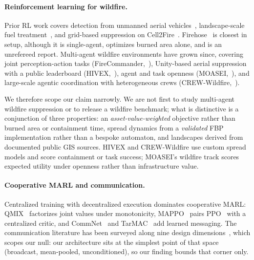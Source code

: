\documentclass[letterpaper]{article}
\begin{document}
\paragraph{Reinforcement learning for wildfire.} Prior RL work covers detection from unmanned aerial vehicles~\citep{ghali2022}, landscape-scale fuel treatment~\citep{altamimi2022wildfire}, and grid-based suppression on Cell2Fire~\citep{shen2022firehose}. Firehose~\citep{shen2022firehose} is closest in setup, although it is single-agent, optimizes burned area alone, and is an unrefereed report. Multi-agent wildfire environments have grown since, covering joint perception-action tasks (FireCommander,~\citealp{seraj2020firecommander}), Unity-based aerial suppression with a public leaderboard (HIVEX,~\citealp{siedler2025hivex}), agent and task openness (MOASEI,~\citealp{patino2025moasei}), and large-scale agentic coordination with heterogeneous crews (CREW-Wildfire,~\citealp{hyun2025crewwildfire}).

We therefore scope our claim narrowly. We are not first to study multi-agent wildfire suppression or to release a wildfire benchmark; what is distinctive is a conjunction of three properties: an \emph{asset-value-weighted} objective rather than burned area or containment time, spread dynamics from a \emph{validated} FBP implementation rather than a bespoke automaton, and landscapes derived from documented public GIS sources. HIVEX and CREW-Wildfire use custom spread models and score containment or task success; MOASEI's wildfire track scores expected utility under openness rather than infrastructure value.

\paragraph{Cooperative MARL and communication.} Centralized training with decentralized execution dominates cooperative MARL: QMIX~\citep{rashid2018qmix} factorizes joint values under monotonicity, MAPPO~\citep{yu2022mappo} pairs PPO~\citep{schulman2017} with a centralized critic, and CommNet~\citep{sukhbaatar2016learning} and TarMAC~\citep{das2019tarmac} add learned messaging. The communication literature has been surveyed along nine design dimensions~\citep{zhu2024commsurvey}, which scopes our null: our architecture sits at the simplest point of that space (broadcast, mean-pooled, unconditioned), so our finding bounds that corner only.
\end{document}
